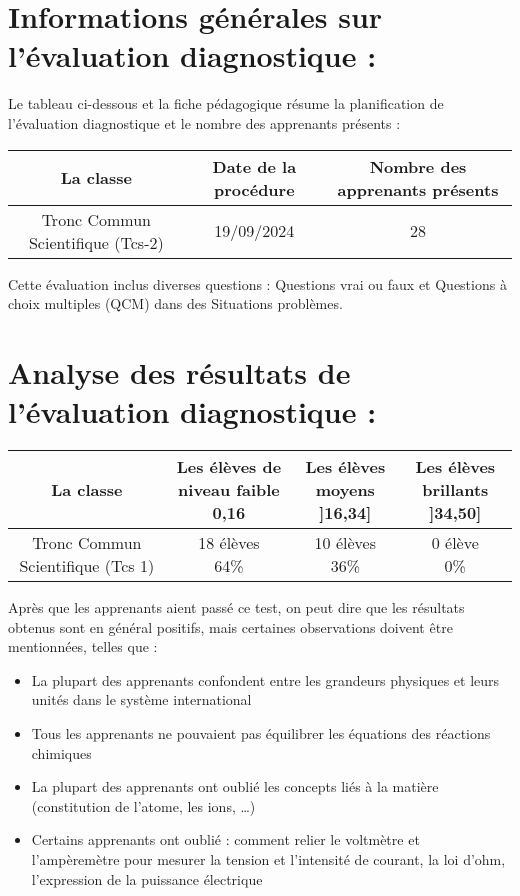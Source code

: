 \documentclass[12pt]{article}
\begin{document}
\section{Informations générales sur l’évaluation diagnostique :  }
Le tableau ci-dessous et la fiche pédagogique résume la planification de l’évaluation diagnostique et le nombre des apprenants présents :
\begin{center}
  \begin{tabular}{|c|c|c|}
	  \hline
	  La classe & Date de la procédure & Nombre des apprenants présents\\\hline
 Tronc Commun Scientifique (Tcs-2) & 19/09/2024 & 28\\\hline
\end{tabular}
\end{center}

Cette évaluation inclus diverses questions : Questions vrai ou faux et Questions à choix multiples (QCM) dans des Situations problèmes.
\section{Analyse des résultats de l’évaluation diagnostique : }

\begin{center}
  \begin{tabular}{|c|c|c|c|}
	  \hline
	  La classe & \makecell{Les élèves de niveau faible \\ 0,16 } & \makecell{Les élèves moyens \\ ]16,34]}& \makecell{Les élèves brillants \\  ]34,50]} \\\hline
Tronc Commun Scientifique (Tcs 1) & \makecell{18 élèves \\ 64\%} & \makecell{10 élèves \\ 36\%}& \makecell{0 élève \\ 0\%} \\\hline
\end{tabular}
\end{center}

Après que les apprenants aient passé ce test, on peut dire que les résultats obtenus sont en général positifs, mais certaines observations doivent être mentionnées, telles que :

\begin{itemize}
	\item La plupart des apprenants confondent entre les grandeurs physiques et leurs unités dans le système international
	\item Tous les apprenants ne pouvaient pas équilibrer les équations des réactions chimiques

	\item La plupart des apprenants ont oublié les concepts liés à la matière (constitution de l’atome, les ions, …)
	\item Certains apprenants ont oublié : comment relier le voltmètre et l’ampèremètre pour mesurer la tension et l’intensité de courant,  la loi d’ohm, l’expression de la puissance électrique
\end{itemize}
\end{document}
